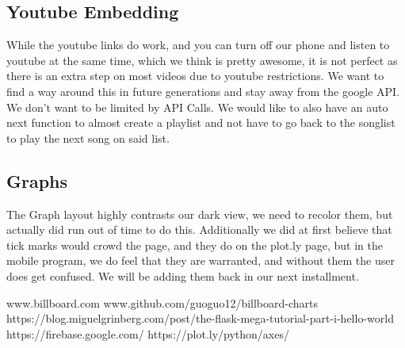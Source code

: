 \documentclass{article}
\begin{document}
\subsection*{Youtube Embedding}
While the youtube links do work, and you can turn off our phone and listen to youtube at the same time, which we think is pretty awesome, it is not perfect as there is an extra step on most videos due to youtube restrictions. We want to find a way around this in future generations and stay away from the google API.
We don't want to be limited by API Calls. We would like to also have an auto next function to almost create a playlist and not have to go back to the songlist to play the next song on said list. 
\subsection*{Graphs}
The Graph layout highly contrasts our dark view, we need to recolor them, but actually did run out of time to do this.
Additionally we did at first believe that tick marks would crowd the page, and they do on the plot.ly page, but in the mobile program, we do feel that they are warranted, and without them the user does get confused.
We will be adding them back in our next installment. 







\begin{thebibliography}{00}
www.billboard.com
www.github.com/guoguo12/billboard-charts
https://blog.miguelgrinberg.com/post/the-flask-mega-tutorial-part-i-hello-world
https://firebase.google.com/
https://plot.ly/python/axes/
\end{thebibliography}
\end{document}
